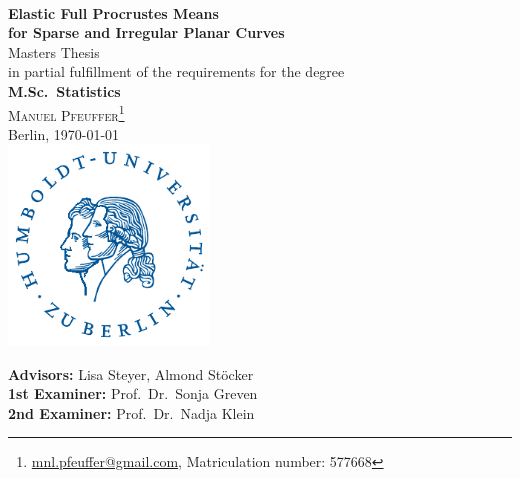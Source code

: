 \documentclass[a4paper,12pt,english,headings=small,oneside]{scrreprt}
\theoremstyle{plain}
\theoremstyle{definition}
\theoremstyle{remark}
\theoremstyle{plain}
\begin{document}

\begin{titlepage}
  \begin{center}
  \\
  \vspace{1.66cm}
    {\LARGE\sffamily\textbf{Elastic Full Procrustes Means\vspace{0.5cm}\\
    for Sparse and Irregular Planar Curves}}
  \vspace{1.2cm}\\
    {\large Masters Thesis}\\
    in partial fulfillment of the requirements for the degree\\
    \textbf{M.Sc.\ Statistics}
  \vspace{1.2cm}\\
  \textsc{\large Manuel Pfeuffer\footnote{\url{mnl.pfeuffer@gmail.com}, Matriculation number: 577668}}\\
  Berlin, \today
  \vspace{2.0cm}\\
    \includegraphics[width=0.4\textwidth]{graphics/hulogo.pdf}
  \vspace{0.5cm}\\

  \vfill
  \end{center}

  \noindent \textbf{Advisors:} Lisa Steyer, Almond Stöcker\\
  \noindent \textbf{1st Examiner:} Prof.\ Dr.\ Sonja Greven\\
  \noindent \textbf{2nd Examiner:} Prof.\ Dr.\ Nadja Klein
  \vspace{0.5em}

\end{titlepage}

\tableofcontents
\end{document}
